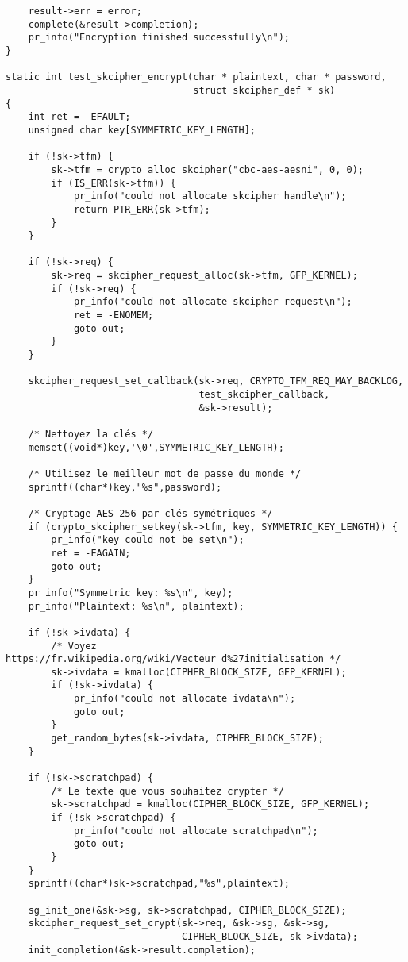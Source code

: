 \documentclass[11pt]{article}
\begin{document}
\begin{verbatim}
    result->err = error;
    complete(&result->completion);
    pr_info("Encryption finished successfully\n");
}

static int test_skcipher_encrypt(char * plaintext, char * password,
                                 struct skcipher_def * sk)
{
    int ret = -EFAULT;
    unsigned char key[SYMMETRIC_KEY_LENGTH];

    if (!sk->tfm) {
        sk->tfm = crypto_alloc_skcipher("cbc-aes-aesni", 0, 0);
        if (IS_ERR(sk->tfm)) {
            pr_info("could not allocate skcipher handle\n");
            return PTR_ERR(sk->tfm);
        }
    }

    if (!sk->req) {
        sk->req = skcipher_request_alloc(sk->tfm, GFP_KERNEL);
        if (!sk->req) {
            pr_info("could not allocate skcipher request\n");
            ret = -ENOMEM;
            goto out;
        }
    }

    skcipher_request_set_callback(sk->req, CRYPTO_TFM_REQ_MAY_BACKLOG,
                                  test_skcipher_callback,
                                  &sk->result);

    /* Nettoyez la clés */
    memset((void*)key,'\0',SYMMETRIC_KEY_LENGTH);

    /* Utilisez le meilleur mot de passe du monde */
    sprintf((char*)key,"%s",password);

    /* Cryptage AES 256 par clés symétriques */
    if (crypto_skcipher_setkey(sk->tfm, key, SYMMETRIC_KEY_LENGTH)) {
        pr_info("key could not be set\n");
        ret = -EAGAIN;
        goto out;
    }
    pr_info("Symmetric key: %s\n", key);
    pr_info("Plaintext: %s\n", plaintext);

    if (!sk->ivdata) {
        /* Voyez https://fr.wikipedia.org/wiki/Vecteur_d%27initialisation */
        sk->ivdata = kmalloc(CIPHER_BLOCK_SIZE, GFP_KERNEL);
        if (!sk->ivdata) {
            pr_info("could not allocate ivdata\n");
            goto out;
        }
        get_random_bytes(sk->ivdata, CIPHER_BLOCK_SIZE);
    }

    if (!sk->scratchpad) {
        /* Le texte que vous souhaitez crypter */
        sk->scratchpad = kmalloc(CIPHER_BLOCK_SIZE, GFP_KERNEL);
        if (!sk->scratchpad) {
            pr_info("could not allocate scratchpad\n");
            goto out;
        }
    }
    sprintf((char*)sk->scratchpad,"%s",plaintext);

    sg_init_one(&sk->sg, sk->scratchpad, CIPHER_BLOCK_SIZE);
    skcipher_request_set_crypt(sk->req, &sk->sg, &sk->sg,
                               CIPHER_BLOCK_SIZE, sk->ivdata);
    init_completion(&sk->result.completion);


\end{verbatim}
\end{document}
